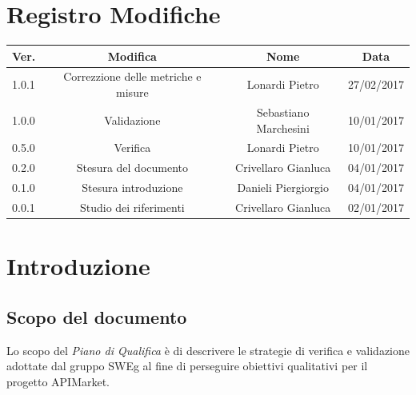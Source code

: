 \documentclass[12pt,a4paper,titlepage]{article}
\begin{document}
	
	
	\clearpage %
	
	
\chead{}
\cfoot{}
\rfoot{\thepage}
\renewcommand{\headrulewidth}{0.2pt}
\renewcommand{\footrulewidth}{0.2pt}
		
\section{Registro Modifiche}
\small %
	
{\renewcommand\arraystretch{1.2}
		\begin{tabular}{|l|c|c|c|}
			\hline
			{\textbf{Ver.}}&{\textbf{Modifica}}&{\textbf{Nome}}&{\textbf{Data}}\\
			\hline
			1.0.1 & Correzzione delle metriche e misure & Lonardi Pietro & 27/02/2017 \\
			\hline
			1.0.0 & Validazione & Sebastiano Marchesini & 10/01/2017 \\
			\hline
			0.5.0 & Verifica & Lonardi Pietro & 10/01/2017 \\
			\hline
			0.2.0 & Stesura del documento & Crivellaro Gianluca & 04/01/2017 \\
			\hline
			0.1.0 & Stesura introduzione & Danieli Piergiorgio & 04/01/2017 \\
			\hline
			0.0.1 & Studio dei riferimenti & Crivellaro Gianluca & 02/01/2017 \\
			\hline
		\end{tabular}
}
	\newpage
	
	\tableofcontents
	\thispagestyle{empty}
	\newpage
	\section{Introduzione}
	\subsection{Scopo del documento}
	Lo scopo del \textit{Piano di Qualifica} è di descrivere le strategie di verifica e validazione adottate dal gruppo SWEg al fine di perseguire obiettivi qualitativi per il progetto APIMarket.
	
\end{document}
